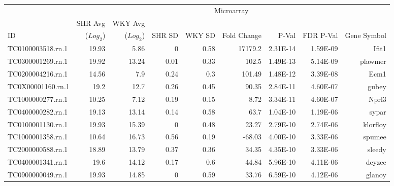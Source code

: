 \begin{sidewaystable}[]
\scriptsize
\centering
\begin{tabular}{lrrrrrrrr}
                  & \multicolumn{8}{c}{Microarray}                                                                                         \\
               & SHR Avg & WKY Avg &  & &  &    & &                    \\
ID                &  ($Log_{2}$) & ($Log_{2}$) & SHR SD & WKY SD & Fold Change & P-Val    & FDR P-Val & Gene Symbol                   \\
\hline
TC0100003518.rn.1 & 19.93          & 5.86           & 0      & 0.58   & 17179.2     & 2.31E-14 & 1.59E-09  & Ifit1                         \\
TC0300001269.rn.1 & 19.92          & 13.24          & 0.01   & 0.33   & 102.5       & 1.49E-13 & 5.14E-09  & plawmer                       \\
TC0200004216.rn.1 & 14.56          & 7.9            & 0.24   & 0.3    & 101.49      & 1.48E-12 & 3.39E-08  & Ecm1                          \\
TC0X00001160.rn.1 & 19.2           & 12.7           & 0.26   & 0.45   & 90.35       & 2.84E-11 & 4.60E-07  & gubey                         \\
TC1000000277.rn.1 & 10.25          & 7.12           & 0.19   & 0.15   & 8.72        & 3.34E-11 & 4.60E-07  & Nprl3                         \\
TC0400000282.rn.1 & 19.13          & 13.14          & 0.14   & 0.58   & 63.7        & 1.04E-10 & 1.19E-06  & sypar                         \\
TC0100001130.rn.1 & 19.93          & 15.39          & 0      & 0.48   & 23.27       & 2.79E-10 & 2.74E-06  & klorfloy                      \\
TC1000001358.rn.1 & 10.64          & 16.73          & 0.56   & 0.19   & -68.03      & 4.00E-10 & 3.33E-06  & spumee                        \\
TC2000000588.rn.1 & 18.89          & 13.79          & 0.37   & 0.36   & 34.35       & 4.35E-10 & 3.33E-06  & sleedy                        \\
TC0400001341.rn.1 & 19.6           & 14.12          & 0.17   & 0.6    & 44.84       & 5.96E-10 & 4.11E-06  & deyzee                        \\
TC0900000049.rn.1 & 19.93          & 14.85          & 0      & 0.59   & 33.76       & 6.59E-10 & 4.12E-06  & glanoy                        \\

\end{tabular}
\end{sidewaystable}
